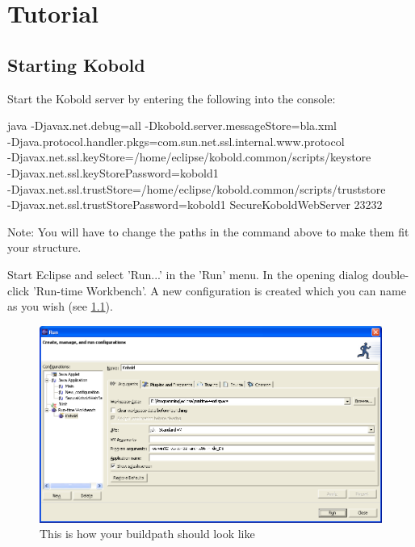 \chapter{Tutorial}

\section{Starting Kobold}

Start the Kobold server by entering the following into the console:\par
java -Djavax.net.debug=all -Dkobold.server.messageStore=bla.xml \\
-Djava.protocol.handler.pkgs=com.sun.net.ssl.internal.www.protocol \\
-Djavax.net.ssl.keyStore=/home/eclipse/kobold.common/scripts/keystore \\
-Djavax.net.ssl.keyStorePassword=kobold1 \\
-Djavax.net.ssl.trustStore=/home/eclipse/kobold.common/scripts/truststore\\
 -Djavax.net.ssl.trustStorePassword=kobold1 SecureKoboldWebServer 23232\par
Note: You will have to change the paths in the command above to make 
them fit your structure.\par

Start Eclipse and select 'Run...' in the 'Run' menu. In the opening dialog 
double-click 'Run-time Workbench'. A new configuration is created which you 
can name as you wish (see \ref{run}). 

\begin{figure}[h!]
\begin{center}
\includegraphics[width=15cm]{run.png}
   \caption{This is how your buildpath should look like}
\label{run}
\end{center}
\end{figure}\par

